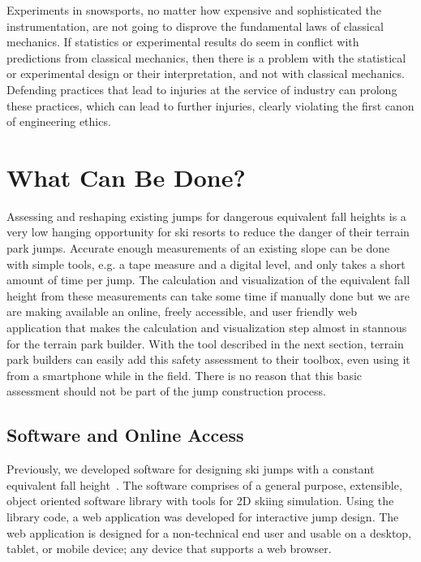 \documentclass{article}
\begin{document}
Experiments in snowsports, no matter how expensive and sophisticated the
instrumentation, are not going to disprove the fundamental laws of classical
mechanics. If statistics or experimental results do seem in conflict with
predictions from classical mechanics, then there is a problem with the
statistical or experimental design or their interpretation, and not with
classical mechanics. Defending practices that lead to injuries at the service
of industry can prolong these practices, which can lead to further injuries,
clearly violating the first canon of engineering ethics.

\section{What Can Be Done?}
%
Assessing and reshaping existing jumps for dangerous equivalent fall heights is
a very low hanging opportunity for ski resorts to reduce the danger of their
terrain park jumps. Accurate enough measurements of an existing slope can be
done with simple tools, e.g. a tape measure and a digital level, and only takes
a short amount of time per jump. The calculation and visualization of the
equivalent fall height from these measurements can take some time if manually
done but we are are making available an online, freely accessible, and user
friendly web application that makes the calculation and visualization step
almost in stannous for the terrain park builder. With the tool described in the
next section, terrain park builders can easily add this safety assessment to
their toolbox, even using it from a smartphone while in the field. There is no
reason that this basic assessment should not be part of the jump construction
process.

\subsection{Software and Online Access}
%
Previously, we developed software for designing ski jumps with a constant
equivalent fall height~\cite{Moore2018}. The software comprises of a general
purpose, extensible, object oriented software library with tools for 2D skiing
simulation. Using the library code, a web application was developed for
interactive jump design. The web application is designed for a non-technical
end user and usable on a desktop, tablet, or mobile device; any device that
supports a web browser.
\end{document}
